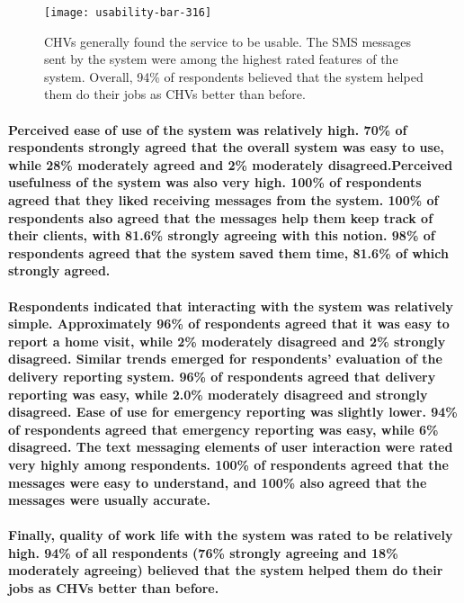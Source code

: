 \begin{figure}[h]
	\begin{center}
	\texttt{[image: usability-bar-316]}
	\end{center}
	\caption[Usability survey results]{CHVs generally found the service to be usable. The SMS messages sent by the system were among the highest rated features of the system. Overall, 94\% of respondents believed that the system helped them do their jobs as CHVs better than before.}
	\label{fig:barchart}
\end{figure}

\paragraph{Perceived ease of use of the system was relatively high. 70\% of respondents strongly agreed that the overall system was easy to use, while 28\% moderately agreed and 2\%  moderately disagreed.Perceived usefulness of the system was also very high. 100\% of respondents agreed that they liked receiving messages from the system. 100\% of respondents also agreed that the messages help them keep track of their clients, with 81.6\% strongly agreeing with this notion. 98\% of respondents agreed that the system saved them time, 81.6\% of which strongly agreed.}

\paragraph{Respondents indicated that interacting with the system was relatively simple.  Approximately 96\% of respondents agreed that it was easy to report a home visit, while 2\% moderately disagreed and 2\% strongly disagreed. Similar trends emerged for respondents' evaluation of the delivery reporting system. 96\% of respondents  agreed that delivery reporting was easy, while 2.0\% moderately disagreed and strongly disagreed. Ease of use for emergency reporting was slightly lower. 94\% of respondents agreed that emergency reporting was easy, while 6\% disagreed. The text messaging elements of user interaction were rated very highly among respondents. 100\% of respondents agreed that the messages were easy to understand, and 100\% also agreed that the messages were usually accurate.}

\paragraph{Finally, quality of work life with the system was rated to be relatively high. 94\% of all respondents (76\% strongly agreeing and 18\% moderately agreeing) believed that the system helped them do their jobs as CHVs better than before.}




